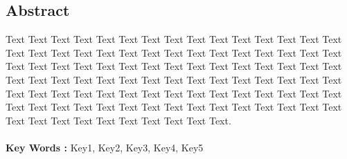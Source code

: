  \begin{latin}
 	\chapter*{Abstract}	
 	\thispagestyle{empty}
 	\renewcommand{\baselinestretch}{1.5}\large
 Text Text Text Text Text Text Text Text Text Text Text Text Text Text Text Text Text Text Text Text Text Text Text Text Text Text Text Text Text Text Text Text Text Text Text Text Text Text Text Text Text Text Text Text Text Text Text Text Text Text Text Text Text Text Text Text Text Text Text Text Text Text Text Text Text Text Text Text Text Text Text Text Text Text Text Text Text Text Text Text Text Text Text Text Text Text Text Text Text Text Text Text Text Text Text Text Text Text Text Text. \\\\
 	\textbf{Key Words :} Key1, Key2, Key3, Key4, Key5
 \end{latin}